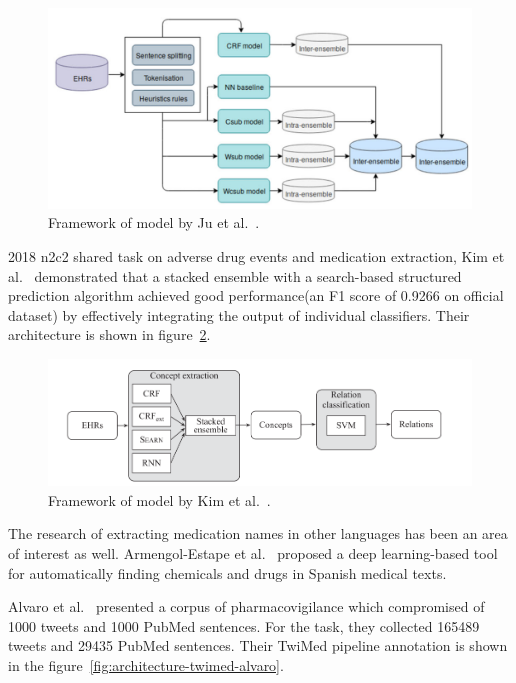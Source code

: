 \begin{figure}[h]
	\centering
	\includegraphics[width=0.99\linewidth]{Figures/c.png}
	\caption{Framework of model by Ju et al.~\cite{ju2020ensemble}.}
	\label{fig:architecture-ju}
\end{figure}

2018 n2c2 shared task on adverse drug events and medication extraction, Kim et al.~\cite{kim2020ensemble} demonstrated that a stacked ensemble with a search-based structured prediction algorithm achieved good performance(an F1 score of 0.9266 on official dataset) by effectively integrating the output of individual classifiers. Their architecture is shown in figure~\ref{fig:architecture-kim}.

\begin{figure}[h]
	\centering
	\includegraphics[width=0.99\linewidth]{Figures/i.png}
	\caption{Framework of model by Kim et al.~\cite{kim2020ensemble}.}
	\label{fig:architecture-kim}
\end{figure}

The research of extracting medication names in other languages has been an area of interest as well. Armengol-Estape et al.~\cite{armengol2019pharmaconer} proposed a deep learning-based tool for automatically finding chemicals and drugs in Spanish medical texts.


Alvaro et al.~\cite{alvaro2017twimed} presented a corpus of pharmacovigilance which compromised of 1000 tweets and 1000 PubMed sentences. For the task, they collected 165489 tweets and 29435 PubMed sentences. Their TwiMed pipeline annotation is shown in the figure~\ref{fig:architecture-twimed-alvaro}.

